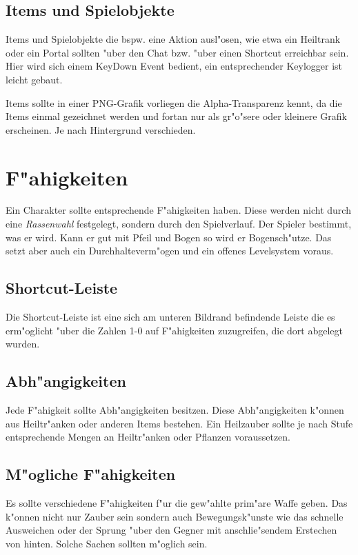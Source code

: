 \documentclass[14pt]{book}
\begin{document}
\section{Items und Spielobjekte}

Items und Spielobjekte die bspw. eine Aktion ausl"osen, wie etwa ein Heiltrank oder ein Portal sollten "uber den Chat bzw. "uber einen Shortcut erreichbar sein. Hier wird sich einem KeyDown Event bedient, ein entsprechender Keylogger ist leicht gebaut.

Items sollte in einer PNG-Grafik vorliegen die Alpha-Transparenz kennt, da die Items einmal gezeichnet werden und fortan nur als gr"o"sere oder kleinere Grafik erscheinen. Je nach Hintergrund verschieden.

\chapter{F"ahigkeiten}

Ein Charakter sollte entsprechende F"ahigkeiten haben. Diese werden nicht durch eine \emph{Rassenwahl} festgelegt, sondern durch den Spielverlauf. Der Spieler bestimmt, was er wird. Kann er gut mit Pfeil und Bogen so wird er Bogensch"utze. Das setzt aber auch ein Durchhalteverm"ogen und ein offenes Levelsystem voraus. 

\section{Shortcut-Leiste}

Die Shortcut-Leiste ist eine sich am unteren Bildrand befindende Leiste die es erm"oglicht "uber die Zahlen 1-0 auf F"ahigkeiten zuzugreifen, die dort abgelegt wurden. 

\section{Abh"angigkeiten}

Jede F"ahigkeit sollte Abh"angigkeiten besitzen. Diese Abh"angigkeiten k"onnen aus Heiltr"anken oder anderen Items bestehen. Ein Heilzauber sollte je nach Stufe entsprechende Mengen an Heiltr"anken oder Pflanzen voraussetzen. 

\section{M"ogliche F"ahigkeiten}

Es sollte verschiedene F"ahigkeiten f"ur die gew"ahlte prim"are Waffe geben. Das k"onnen nicht nur Zauber sein sondern auch Bewegungsk"unste wie das schnelle Ausweichen oder der Sprung "uber den Gegner mit anschlie"sendem Erstechen von hinten. Solche Sachen sollten m"oglich sein.
\end{document}
